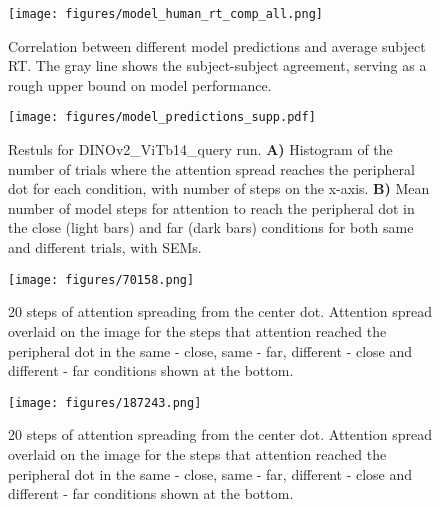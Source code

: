 \documentclass{article}
\begin{document}
\begin{figure}[ht]
\begin{center}
\texttt{[image: figures/model\_human\_rt\_comp\_all.png]}
\end{center}
\caption{Correlation between different model predictions and average subject RT. The gray line shows the subject-subject agreement, serving as a rough upper bound on model performance.} %
\label{fig:model_predictions_supp}
\end{figure}






\begin{figure}[ht]
\begin{center}
\texttt{[image: figures/model\_predictions\_supp.pdf]}
\end{center}
\caption{ Restuls for DINOv2\_ViTb14\_query run. \textbf{A)} Histogram of the number of trials where the attention spread reaches the peripheral dot for each condition, with number of steps on the x-axis. \textbf{B)} Mean number of model steps for attention to reach the peripheral dot in the close (light bars) and far (dark bars) conditions for both same and different trials, with SEMs.} %
\label{fig:model_pred_q}
\end{figure}

\begin{figure*}[h]
\begin{center}
\texttt{[image: figures/70158.png]}
\end{center}
\caption{20 steps of attention spreading from the center dot. Attention spread overlaid on the image for the steps that attention reached the peripheral dot in the same - close, same - far, different - close and different - far conditions shown at the bottom.}
\label{fig:spread_s1}
\end{figure*}

\begin{figure*}[h]
\begin{center}
\texttt{[image: figures/187243.png]}
\end{center}
\caption{20 steps of attention spreading from the center dot. Attention spread overlaid on the image for the steps that attention reached the peripheral dot in the same - close, same - far, different - close and different - far conditions shown at the bottom.}
\label{fig:spread_s2}
\end{figure*}
\end{document}
